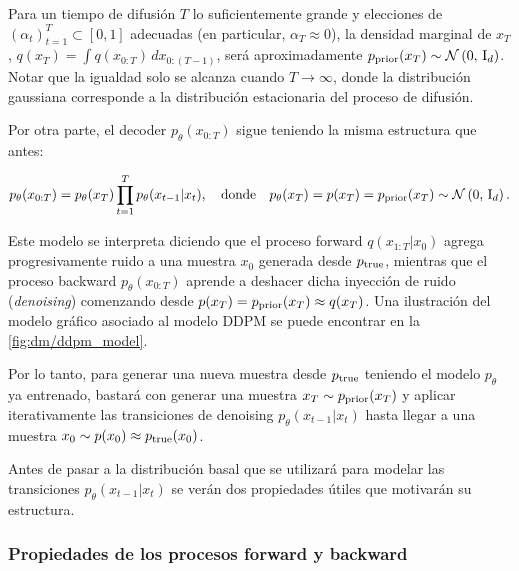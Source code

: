 Para un tiempo de difusión $T$ lo suficientemente grande y elecciones de $(\alpha_t)_{t=1}^T\subset[0,1]$ adecuadas (en particular, $\alpha_T\approx 0$), la densidad marginal de $x_T$, $q(x_T)=\int q(x_{0:T})\, dx_{0:(T-1)}$, será aproximadamente $p_{\operatorname{prior}}(x_T)\sim\mathcal{N}\left(0,\,\operatorname{I}_{d}\right)$. Notar que la igualdad solo se alcanza cuando $T\to\infty$, donde la distribución gaussiana corresponde a la distribución estacionaria del proceso de difusión.

Por otra parte, el decoder $p_\theta(x_{0:T})$ sigue teniendo la misma estructura que antes:

\begin{equation}
    \label{eq:ddpm_backward}
    p_\theta(x_{0:T}) = p_\theta(x_T)\prod_{t=1}^{T} p_\theta(x_{t-1}|x_t),
    \quad\text{donde}\quad
    p_\theta(x_T) = p(x_T) = p_{\operatorname{prior}}(x_T) \sim \mathcal{N}\left(0,\,\operatorname{I}_{d}\right).
\end{equation}

Este modelo se interpreta diciendo que el proceso forward $q(x_{1:T}|x_0)$ agrega progresivamente ruido a una muestra $x_0$ generada desde $p_{\operatorname{true}}$, mientras que el proceso backward $p_\theta(x_{0:T})$ aprende a deshacer dicha inyección de ruido (\textit{denoising}) comenzando desde $p(x_T)= p_{\operatorname{prior}}(x_T)\approx q(x_T)$. Una ilustración del modelo gráfico asociado al modelo DDPM se puede encontrar en la \autoref{fig:dm/ddpm_model}.


Por lo tanto, para generar una nueva muestra desde $p_{\operatorname{true}}$ teniendo el modelo $p_\theta$ ya entrenado, bastará con generar una muestra $x_T\sim p_{\operatorname{prior}}(x_T)$ y aplicar iterativamente las transiciones de denoising $p_\theta(x_{t-1}|x_t)$ hasta llegar a una muestra $x_0\sim p(x_0)\approx p_{\operatorname{true}}(x_0)$.

Antes de pasar a la distribución basal que se utilizará para modelar las transiciones $p_\theta(x_{t-1}|x_t)$ se verán dos propiedades útiles que motivarán su estructura.

\subsubsection{Propiedades de los procesos forward y backward}

